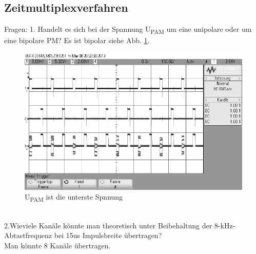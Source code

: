 \documentclass[12pt,a4paper]{scrartcl}
\begin{document}
  \subsection{Zeitmultiplexverfahren}
  \label{sub-sec-zeitmultiplexverfahren}
  Fragen:
  1. Handelt es sich bei der Spannung U\textsubscript{PAM} um  eine unipolare oder um eine bipolare PM?
  Es ist bipolar siehe Abb. \ref{fig:scope_23}.
    \begin{figure}[htbp]
    \begin{minipage}{1\textwidth}
         \centering
         \includegraphics[width=1\textwidth]{scope_23}
         \caption{U\textsubscript{PAM} ist die unterste Spnnung}
   
          \label{fig:scope_23}
    \end{minipage}
    \end{figure}\\
    2.Wieviele Kanäle könnte man theoretisch unter Beibehaltung der 8-kHz-Abtastfrequenz bei 15us Impulsbreite übertragen?\\
    Man könnte 8 Kanäle übertragen.
    
\end{document}
